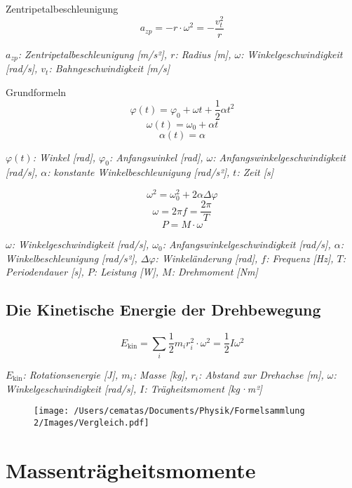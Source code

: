 \documentclass[a4paper,10pt]{article}
\newenvironment{displayformula}
{
	\begin{framed}
		\color{formulaColor}
	}
	{\end{framed}}
\newcommand{\formulalegend}[1]{%
	\par\vspace{0.5ex}%
	{{\color{legendColor}\RaggedRight\small\textit{#1}}}%
	\par\vspace{1.5ex}%
}
\begin{document}
\begin{displayformula}
	Zentripetalbeschleunigung
	\[
	a_{zp} = -r \cdot \omega^2 = - \frac{v_t^2}{r}
	\]
\end{displayformula}
\formulalegend{
	\( a_{zp} \): Zentripetalbeschleunigung [m/s²], \( r \): Radius [m], \( \omega \): Winkelgeschwindigkeit [rad/s], \( v_t \): Bahngeschwindigkeit [m/s]
}

\begin{displayformula}
	Grundformeln
	\[
	\varphi (t) = \varphi_0 + \omega t + \frac{1}{2} \alpha t^2
	\]
	\[
	\omega (t) = \omega_0 + \alpha t
	\]
	\[
	\alpha (t) = \alpha
	\]
\end{displayformula}
\formulalegend{
	\( \varphi(t) \): Winkel [rad], \( \varphi_0 \): Anfangswinkel [rad], \( \omega \): Anfangswinkelgeschwindigkeit [rad/s], \( \alpha \): konstante Winkelbeschleunigung [rad/s²], \( t \): Zeit [s]
}

\begin{displayformula}
	\[
	\omega^2 = \omega_0^2 + 2\alpha \Delta\varphi
	\]
	\[
	\omega = 2\pi f = \frac{2\pi}{T}
	\]
	\[
	P = M \cdot \omega
	\]
\end{displayformula}
\formulalegend{
	\( \omega \): Winkelgeschwindigkeit [rad/s], \( \omega_0 \): Anfangswinkelgeschwindigkeit [rad/s], \( \alpha \): Winkelbeschleunigung [rad/s²], \( \Delta \varphi \): Winkeländerung [rad], \( f \): Frequenz [Hz], \( T \): Periodendauer [s], \( P \): Leistung [W], \( M \): Drehmoment [Nm]
}

\subsection{Die Kinetische Energie der Drehbewegung}

\begin{displayformula}
	\[
	E_{\text{kin}} = \sum_i \frac{1}{2} m_i r_i^2 \cdot \omega^2 = \frac{1}{2} I \omega^2
	\]
\end{displayformula}
\formulalegend{
	\( E_{\text{kin}} \): Rotationsenergie [J], \( m_i \): Masse [kg], \( r_i \): Abstand zur Drehachse [m], \( \omega \): Winkelgeschwindigkeit [rad/s], \( I \): Trägheitsmoment [kg·m²]
}

\begin{figure}[h!]
	\centering
	\texttt{[image: /Users/cematas/Documents/Physik/Formelsammlung 2/Images/Vergleich.pdf]}
	\label{fig:beispiel}
\end{figure}

\section{Massenträgheitsmomente}
\end{document}
